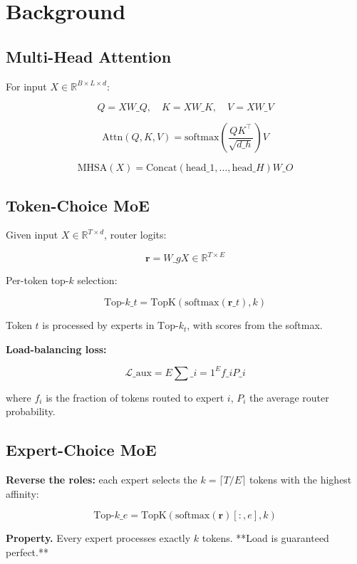 \section{Background}

\subsection{Multi-Head Attention}

For input $X \in \mathbb{R}^{B \times L \times d}$:

\[
Q = X W\_Q, \quad K = X W\_K, \quad V = X W\_V
\tag{3.1}
\]

\[
\text{Attn}(Q, K, V) = \text{softmax}\!\left(\frac{Q K^\top}{\sqrt{d\_h}}\right) V
\tag{3.2}
\]

\[
\text{MHSA}(X) = \text{Concat}(\text{head}\_1, \dots, \text{head}\_H) W\_O
\tag{3.3}
\]

\subsection{Token-Choice MoE}

Given input $X \in \mathbb{R}^{T \times d}$, router logits:

\[
\mathbf{r} = W\_g X \in \mathbb{R}^{T \times E}
\tag{3.4}
\]

Per-token top-$k$ selection:

\[
\text{Top-}k\_t = \text{TopK}(\text{softmax}(\mathbf{r}\_t), k)
\tag{3.5}
\]

Token $t$ is processed by experts in $\text{Top-}k_t$, with scores from the 
softmax.

\textbf{Load-balancing loss:}

\[
\mathcal{L}\_\text{aux} = E \sum\_{i=1}^{E} f\_i P\_i
\tag{3.6}
\]

where $f_i$ is the fraction of tokens routed to expert $i$, $P_i$ the 
average router probability.

\subsection{Expert-Choice MoE}

\textbf{Reverse the roles:} each expert selects the $k = \lceil T / E \rceil$ 
tokens with the highest affinity:

\[
\text{Top-}k\_e = \text{TopK}\!\left(\text{softmax}(\mathbf{r})[:, e], k\right)
\tag{3.7}
\]

\textbf{Property.} Every expert processes exactly $k$ tokens. **Load is 
guaranteed perfect.**

